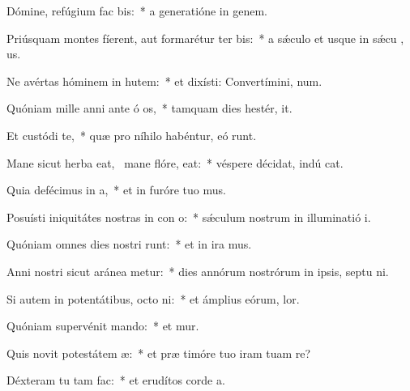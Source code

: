 \item Dómine, refúgium fac  bis:~* a generatióne in genem.
\item Priúsquam montes fíerent, aut formarétur ter  bis:~* a sǽculo et usque in sǽcu  , us.
\item Ne avértas hóminem in hutem:~* et dixísti: Convertímini,  num.
\item Quóniam mille anni ante ó os,~* tamquam dies hestér,  it.
\item Et custódi  te,~* quæ pro níhilo habéntur, eó  runt.
\item Mane sicut herba eat,~\pscross{} mane flóre,  eat:~* véspere décidat, indú  cat.
\item Quia defécimus in  a,~* et in furóre tuo  mus.
\item Posuísti iniquitátes nostras in con o:~* sǽculum nostrum in illuminatió  i.
\item Quóniam omnes dies nostri runt:~* et in ira  mus.
\item Anni nostri sicut aránea metur:~* dies annórum nostrórum in ipsis, septu ni.
\item Si autem in potentátibus, octo ni:~* et ámplius eórum,   lor.
\item Quóniam supervénit mando:~* et mur.
\item Quis novit potestátem  æ:~* et præ timóre tuo iram tuam re?
\item Déxteram tu  tam fac:~* et erudítos corde  a.
